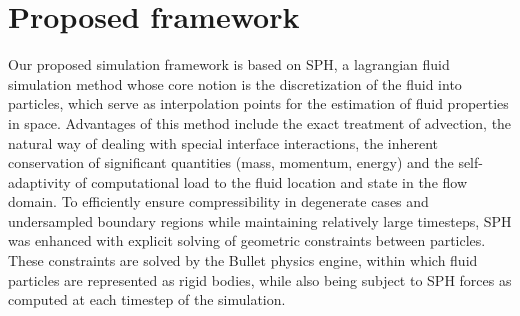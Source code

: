 \documentclass{llncs}
\begin{document}
\section{Proposed framework}
Our proposed simulation framework is based on SPH, a lagrangian fluid simulation method
whose core notion is the discretization of the fluid into particles, which serve as
interpolation points for the estimation of fluid properties in space. Advantages of this
method include the exact treatment of advection, the natural way of dealing with special
interface interactions, the inherent conservation of significant quantities (mass,
momentum, energy) and the self-adaptivity of computational load to the fluid location and
state in the flow domain. To efficiently ensure compressibility in degenerate cases and
undersampled boundary regions while maintaining relatively large timesteps, SPH was
enhanced with explicit solving of geometric constraints between particles. These
constraints are solved by the Bullet physics engine, within which fluid particles are
represented as rigid bodies, while also being subject to SPH forces as computed at each
timestep of the simulation.
\end{document}
